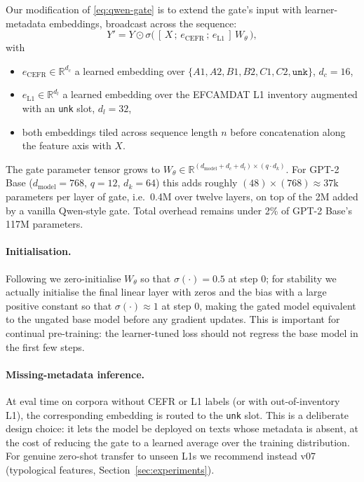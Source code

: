 Our modification of \eqref{eq:qwen-gate} is to extend the gate's input
with learner-metadata embeddings, broadcast across the sequence:
\begin{equation}
  Y' = Y \odot \sigma\!\bigl(\,[\,X \,;\, e_\text{CEFR}\,;\, e_\text{L1}\,]\, W_\theta\,\bigr),
  \label{eq:metadata-gate}
\end{equation}
with
\begin{itemize}
  \item $e_\text{CEFR} \in \mathbb{R}^{d_c}$ a learned embedding over
    $\{A1, A2, B1, B2, C1, C2, \texttt{unk}\}$, $d_c = 16$,
  \item $e_\text{L1} \in \mathbb{R}^{d_l}$ a learned embedding over the
    EFCAMDAT L1 inventory augmented with an \texttt{unk} slot,
    $d_l = 32$,
  \item both embeddings tiled across sequence length $n$ before
    concatenation along the feature axis with $X$.
\end{itemize}
The gate parameter tensor grows to
$W_\theta \in \mathbb{R}^{(d_\text{model} + d_c + d_l) \times (q \cdot d_k)}$.
For GPT-2 Base ($d_\text{model}{=}768$, $q{=}12$, $d_k{=}64$) this adds
roughly $(48) \times (768) \approx 37\text{k}$ parameters per layer of
gate, i.e.~0.4M over twelve layers, on top of the 2M added by a vanilla
Qwen-style gate. Total overhead remains under 2\% of GPT-2 Base's 117M
parameters.

\paragraph{Initialisation.}
Following \citet{qiu2025gated} we zero-initialise $W_\theta$ so that
$\sigma(\cdot) = 0.5$ at step 0; for stability we actually initialise
the final linear layer with zeros and the bias with a large positive
constant so that $\sigma(\cdot) \approx 1$ at step 0, making the gated
model equivalent to the ungated base model before any gradient updates.
This is important for continual pre-training: the learner-tuned loss
should not regress the base model in the first few steps.

\paragraph{Missing-metadata inference.}
At eval time on corpora without CEFR or L1 labels (or with
out-of-inventory L1), the corresponding embedding is routed to the
\texttt{unk} slot. This is a deliberate design choice: it lets the
model be deployed on texts whose metadata is absent, at the cost of
reducing the gate to a learned average over the training distribution.
For genuine zero-shot transfer to unseen L1s we recommend instead v07
(typological features, Section~\ref{sec:experiments}).

